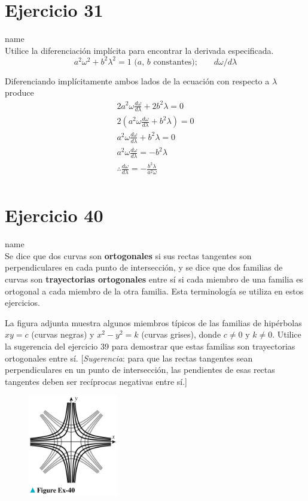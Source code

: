 \documentclass[12pt]{article}
\begin{document}
\section{Ejercicio 31} name \\

Utilice la diferenciación implícita para encontrar la derivada especificada.
\[ a^2 \omega^2 + b^2 \lambda^2 = 1 \text{ ($a$, $b$ constantes);}\qquad d\omega /d\lambda \]

Diferenciando implícitamente ambos lados de la ecuación con respecto a $\lambda$ produce
\begin{align*}
  2a^2\omega \frac{d\omega}{d\lambda}+2b^2\lambda=0\\
  2(a^2\omega \frac{d\omega}{d\lambda}+b^2\lambda)=0\\
  a^2\omega \frac{d\omega}{d\lambda}+b^2\lambda=0\\
  a^2\omega \frac{d\omega}{d\lambda}=-b^2\lambda\\
  \therefore \frac{d\omega}{d\lambda}=-\frac{b^2\lambda}{a^2\omega}\\
\end{align*}

\section{Ejercicio 40} name \\

Se dice que dos curvas son \textbf{ortogonales} si sus rectas tangentes son perpendiculares en cada punto de intersección, y se dice que dos familias de curvas son \textbf{trayectorias ortogonales} entre sí si cada miembro de una familia es ortogonal a cada miembro de la otra familia. Esta terminología se utiliza en estos ejercicios.

La figura adjunta muestra algunos miembros típicos de las familias de hipérbolas $xy=c$ (curvas negras) y $x^2-y^2=k$ (curvas grises), donde $c \neq 0$ y $k \neq 0$. Utilice la sugerencia del ejercicio 39 para demostrar que estas familias son trayectorias ortogonales entre sí. [\textit{Sugerencia}: para que las rectas tangentes sean perpendiculares en un punto de intersección, las pendientes de esas rectas tangentes deben ser recíprocas negativas entre sí.]

\begin{figure}[H]
\centering
\includegraphics[width=0.35\textwidth]{../img/img_Lista2/3_40.png}
\end{figure}
\end{document}
